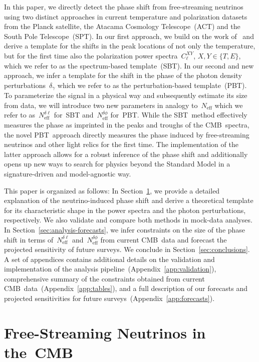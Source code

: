 \documentclass[11pt]{article}
\numberwithin{equation}{section}
\newcommand{\Neff}{N_\mathrm{eff}}
\newcommand{\Nphase}{N_\mathrm{eff}^{\delta\phi}}
\newcommand{\Nmultipole}{N_\mathrm{eff}^{\delta\ell}}
\begin{document}
In this paper, we directly detect the phase shift from free-streaming neutrinos using two distinct approaches in current temperature and polarization datasets from the Planck satellite, the Atacama Cosmology Telescope~(ACT) and the South Pole Telescope~(SPT). In our first approach, we build on the work of~\cite{Follin:2015hya} and derive a template for the shifts in the peak locations of not only the temperature, but for the first time also the polarization power spectra~$C_\ell^{XY}$\hskip-2pt, $X,Y \in \{T, E\}$, which we refer to as the spectrum-based template~(SBT). In our second and new approach, we infer a template for the shift in the phase of the photon density perturbations~$\delta_\gamma$ which we refer to as the perturbation-based template~(PBT). To parameterize the signal in a physical way and subsequently estimate its size from data, we will introduce two new parameters in analogy to~$\Neff$ which we refer to as~$\Nmultipole$ for~SBT and~$\Nphase$ for~PBT. While the SBT~method effectively measures the phase as imprinted in the peaks and troughs of the CMB~spectra, the novel PBT~approach directly measures the phase induced by free-streaming neutrinos and other light relics for the first time. The implementation of the latter approach allows for a robust inference of the phase shift and additionally opens up new ways to search for physics beyond the Standard Model in a signature-driven and model-agnostic way.\bigskip

This paper is organized as follows: In Section~\ref{sec:background}, we provide a detailed explanation of the neutrino-induced phase shift and derive a theoretical template for its characteristic shape in the power spectra and the photon perturbations, respectively. We also validate and compare both methods in mock-data analyses. In Section~\ref{sec:analysis-forecasts}, we infer constraints on the size of the phase shift in terms of~$\Nmultipole$ and~$\Nphase$ from current CMB~data and forecast the projected sensitivity of future surveys. We conclude in Section~\ref{sec:conclusions}. A set of appendices contains additional details on the validation and implementation of the analysis pipeline~(Appendix~\ref{app:validation}), comprehensive summary of the constraints obtained from current CMB~data~(Appendix~\ref{app:tables}), and a full description of our forecasts and projected sensitivities for future surveys~(Appendix~\ref{app:forecasts}).



\section{Free-Streaming Neutrinos in the~CMB}
\label{sec:background}
\end{document}
